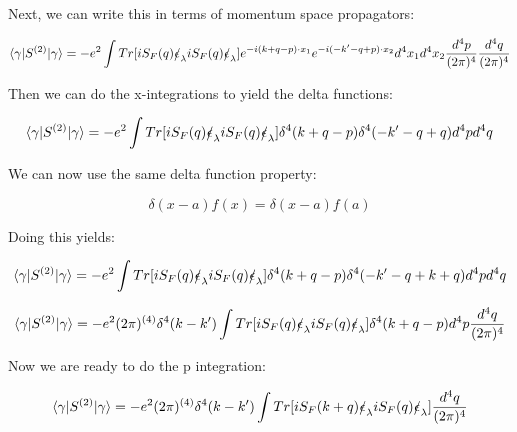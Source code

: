 \documentclass[a4]{article}
\begin{document}
\begin{framed}
            Next, we can write this in terms of momentum space propagators:

            \begin{equation}
                \langle \gamma | S^{(2)} | \gamma \rangle = - e^{2} \int Tr [i S_{F} (q) \slashed{\epsilon}_{\lambda} i S_{F} (q) \slashed{\epsilon}_{\lambda}] e^{- i (k + q - p) \cdot x_1} e^{- i (- k' - q + p) \cdot x_2} d^4 x_1 d^4 x_2 \frac{d^4 p}{(2 \pi)^4} \frac{d^4 q}{(2 \pi)^4}
            \end{equation}

            Then we can do the x-integrations to yield the delta functions:

            \begin{equation}
                \langle \gamma | S^{(2)} | \gamma \rangle = - e^{2} \int Tr [i S_{F} (q) \slashed{\epsilon}_{\lambda} i S_{F} (q) \slashed{\epsilon}_{\lambda}] \delta^4 (k + q - p) \delta^4 (- k' - q + q) d^4 p d^4 q
            \end{equation}

            We can now use the same delta function property:

            \begin{equation}
                \delta (x - a) f (x) = \delta (x - a) f(a)
            \end{equation}

            Doing this yields:

            \begin{equation}
                \langle \gamma | S^{(2)} | \gamma \rangle = - e^{2} \int Tr [i S_{F} (q) \slashed{\epsilon}_{\lambda} i S_{F} (q) \slashed{\epsilon}_{\lambda}] \delta^4 (k + q - p) \delta^4 (- k' - q + k + q) d^4 p d^4 q
            \end{equation}

            \begin{equation}
                \langle \gamma | S^{(2)} | \gamma \rangle = - e^{2} (2 \pi)^{(4)} \delta^4 (k - k') \int Tr [i S_{F} (q) \slashed{\epsilon}_{\lambda} i S_{F} (q) \slashed{\epsilon}_{\lambda}] \delta^4 (k + q - p) d^4 p \frac{d^4 q}{(2 \pi)^4}
            \end{equation}

            Now we are ready to do the p integration:

            \begin{equation}
                \langle \gamma | S^{(2)} | \gamma \rangle = - e^{2} (2 \pi)^{(4)} \delta^4 (k - k') \int Tr [i S_{F} (k + q) \slashed{\epsilon}_{\lambda} i S_{F} (q) \slashed{\epsilon}_{\lambda}] \frac{d^4 q}{(2 \pi)^4}
            \end{equation}

        \end{framed}
\end{document}
